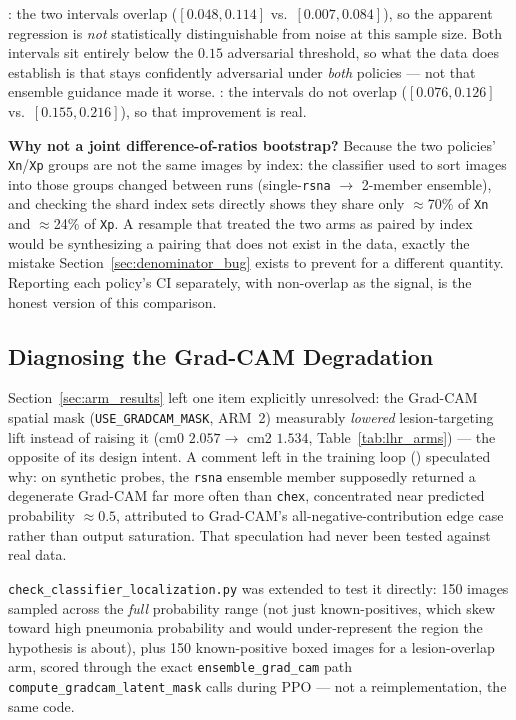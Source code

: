 \ntop{}: the two intervals overlap ($[0.048, 0.114]$ vs.\ $[0.007, 0.084]$),
so the apparent regression is \emph{not} statistically distinguishable from
noise at this sample size. Both intervals sit entirely below the $0.15$
adversarial threshold, so what the data does establish is that \ntop{}
stays confidently adversarial under \emph{both} policies --- not that
ensemble guidance made it worse. \pton{}: the intervals do not overlap
($[0.076, 0.126]$ vs.\ $[0.155, 0.216]$), so that improvement is real.

\textbf{Why not a joint difference-of-ratios bootstrap?} Because the two
policies' \texttt{Xn}/\texttt{Xp} groups are not the same images by index:
the classifier used to sort images into those groups changed between runs
(single-\texttt{rsna} $\to$ 2-member ensemble), and checking the shard
index sets directly shows they share only $\approx$70\% of \texttt{Xn} and
$\approx$24\% of \texttt{Xp}. A resample that treated the two arms as
paired by index would be synthesizing a pairing that does not exist in the
data, exactly the mistake Section~\ref{sec:denominator_bug} exists to
prevent for a different quantity. Reporting each policy's CI separately,
with non-overlap as the signal, is the honest version of this comparison.

\subsection{Diagnosing the Grad-CAM Degradation}
\label{sec:gradcam_diag}

Section~\ref{sec:arm_results} left one item explicitly unresolved: the
Grad-CAM spatial mask (\texttt{USE\_GRADCAM\_MASK}, ARM~2) measurably
\emph{lowered} lesion-targeting lift instead of raising it (cm0
$2.057 \to$ cm2 $1.534$, Table~\ref{tab:lhr_arms}) --- the opposite of its
design intent. A comment left in the training loop
() speculated why: on synthetic probes, the
\texttt{rsna} ensemble member supposedly returned a degenerate Grad-CAM
far more often than \texttt{chex}, concentrated near predicted probability
$\approx 0.5$, attributed to Grad-CAM's all-negative-contribution edge
case rather than output saturation. That speculation had never been
tested against real data.

\texttt{check\_classifier\_localization.py} was extended to test it
directly: 150 images sampled across the \emph{full} probability range
(not just known-positives, which skew toward high pneumonia probability
and would under-represent the region the hypothesis is about), plus 150
known-positive boxed images for a lesion-overlap arm, scored through the
exact \texttt{ensemble\_grad\_cam} path
\texttt{compute\_gradcam\_latent\_mask} calls during PPO --- not a
reimplementation, the same code.

